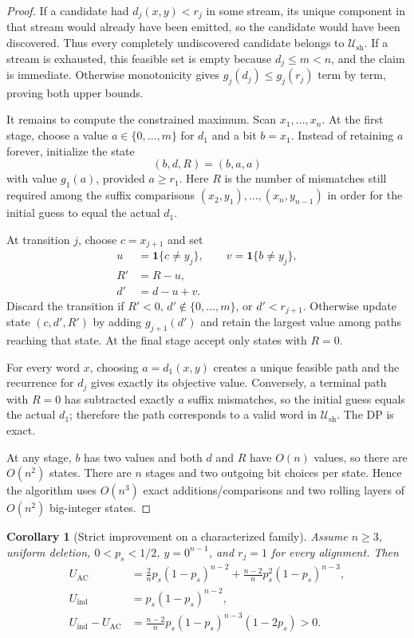 \documentclass[11pt]{article}
\newtheorem{corollary}[theorem]{Corollary}
\theoremstyle{remark}
\newcommand{\ind}{\mathbf 1}
\begin{document}
\begin{proof}
If a candidate had $d_j(x,y)<r_j$ in some stream, its unique component in that stream
would already have been emitted, so the candidate would have been discovered. Thus every
completely undiscovered candidate belongs to $\mathcal U_{\mathrm{sh}}$. If a stream is
exhausted, this feasible set is empty because $d_j\le m<n$, and the claim is immediate.
Otherwise monotonicity gives $g_j(d_j)\le g_j(r_j)$ term by term, proving both upper bounds.

It remains to compute the constrained maximum. Scan $x_1,\ldots,x_n$. At the first stage,
choose a value $a\in\{0,\ldots,m\}$ for $d_1$ and a bit $b=x_1$. Instead of retaining
$a$ forever, initialize the state
\[
 (b,d,R)=(b,a,a)
\]
with value $g_1(a)$, provided $a\ge r_1$. Here $R$ is the number of mismatches still
required among the suffix comparisons $(x_2,y_1),\ldots,(x_n,y_{n-1})$ in order for the
initial guess to equal the actual $d_1$.

At transition $j$, choose $c=x_{j+1}$ and set
\begin{align*}
 u&=\ind\{c\ne y_j\},\qquad v=\ind\{b\ne y_j\},\\
 R'&=R-u,\\
 d'&=d-u+v.
\end{align*}
Discard the transition if $R'<0$, $d'\notin\{0,\ldots,m\}$, or $d'<r_{j+1}$.
Otherwise update state $(c,d',R')$ by adding $g_{j+1}(d')$ and retain the largest value
among paths reaching that state. At the final stage accept only states with $R=0$.

For every word $x$, choosing $a=d_1(x,y)$ creates a unique feasible path and the recurrence
for $d_j$ gives exactly its objective value. Conversely, a terminal path with $R=0$ has
subtracted exactly $a$ suffix mismatches, so the initial guess equals the actual $d_1$;
therefore the path corresponds to a valid word in $\mathcal U_{\mathrm{sh}}$. The DP is
exact.

At any stage, $b$ has two values and both $d$ and $R$ have $O(n)$ values, so there are
$O(n^2)$ states. There are $n$ stages and two outgoing bit choices per state. Hence the algorithm uses $O(n^3)$ exact additions/comparisons and two rolling layers of $O(n^2)$ big-integer states.
\end{proof}

\begin{corollary}[Strict improvement on a characterized family]
Assume $n\ge3$, uniform deletion, $0<p_s<1/2$, $y=0^{n-1}$, and $r_j=1$ for every alignment. Then
\begin{align*}
 U_{\mathrm{AC}}
 &=\frac{2}{n}p_s(1-p_s)^{n-2}
 +\frac{n-2}{n}p_s^2(1-p_s)^{n-3},\\
 U_{\mathrm{ind}}&=p_s(1-p_s)^{n-2},\\
 U_{\mathrm{ind}}-U_{\mathrm{AC}}
 &=\frac{n-2}{n}p_s(1-p_s)^{n-3}(1-2p_s)>0.
\end{align*}
\end{corollary}
\end{document}
